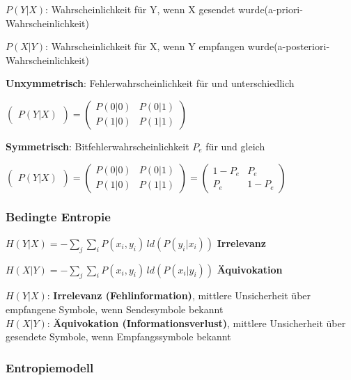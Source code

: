$P(Y|X)$: \frqq Wahrscheinlichkeit für Y, wenn X gesendet wurde\flqq (a-priori-Wahrscheinlichkeit)

$P(X|Y)$: \frqq Wahrscheinlichkeit für X, wenn Y empfangen wurde\flqq (a-posteriori-Wahrscheinlichkeit)

\textbf{Unxymmetrisch}: Fehlerwahrscheinlichkeit für \flqq{} und \flqq{} unterschiedlich

$\displaystyle{
    \begin{pmatrix}
        P(Y|X)    
    \end{pmatrix}
    =
    \begin{pmatrix}
        P(0|0) & P(0|1)\\
        P(1|0) & P(1|1)
    \end{pmatrix}
}$

\textbf{Symmetrisch}: Bitfehlerwahrscheinlichkeit $P_e$ für \flqq{} und \flqq{} gleich

$\displaystyle{
    \begin{pmatrix}
        P(Y|X)    
    \end{pmatrix}
    =
    \begin{pmatrix}
        P(0|0) & P(0|1)\\
        P(1|0) & P(1|1)
    \end{pmatrix}
    =
    \begin{pmatrix}
        1-P_e & P_e\\
        P_e & 1-P_e
    \end{pmatrix}
}$

\subsubsection{Bedingte Entropie}

$\displaystyle{
    H(Y|X) = - \sum_{j} \sum_{i} P(x_i, y_i)\,ld(P(y_i|x_i))
}$\;\; \textbf{Irrelevanz}

$\displaystyle{
    H(X|Y) = - \sum_{j} \sum_{i} P(x_i, y_i)\,ld(P(x_i|y_i))
}$\;\; \textbf{Äquivokation}

$H(Y|X)$: \textbf{Irrelevanz (Fehlinformation)}, mittlere Unsicherheit über empfangene Symbole, wenn Sendesymbole bekannt\\
$H(X|Y)$: \textbf{Äquivokation (Informationsverlust)}, mittlere Unsicherheit über gesendete Symbole, wenn Empfangssymbole bekannt

\subsubsection{Entropiemodell}

